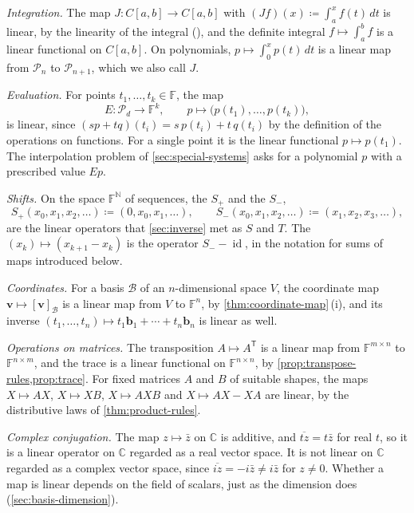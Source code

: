 \emph{Integration.} The map $J\colon C[a,b]\to C[a,b]$ with $(Jf)(x)\coloneqq\int_a^xf(t)\,dt$ is linear, by the linearity of the integral (), and the definite integral $f\mapsto\int_a^bf$ is a linear functional on $C[a,b]$. On polynomials, $p\mapsto\int_0^xp(t)\,dt$ is a linear map from $\mathcal P_n$ to $\mathcal P_{n+1}$, which we also call $J$.

\emph{Evaluation.} For points $t_1,\ldots,t_k\in\mathbb F$, the map
\[
E\colon\mathcal P_d\to\mathbb F^k,\qquad p\mapsto\bigl(p(t_1),\ldots,p(t_k)\bigr),
\]
is linear, since $(sp+tq)(t_i)=s\,p(t_i)+t\,q(t_i)$ by the definition of the operations on functions. For a single point it is the linear functional $p\mapsto p(t_1)$. The interpolation problem of \cref{sec:special-systems} asks for a polynomial $p$ with a prescribed value $Ep$.

\emph{Shifts.} On the space $\mathbb F^{\mathbb N}$ of sequences, the  $S_+$ and the  $S_-$,
\[
S_+(x_0,x_1,x_2,\ldots)\coloneqq(0,x_0,x_1,\ldots),\qquad S_-(x_0,x_1,x_2,\ldots)\coloneqq(x_1,x_2,x_3,\ldots),
\]
are the linear operators that \cref{sec:inverse} met as $S$ and $T$. The  $(x_k)\mapsto(x_{k+1}-x_k)$ is the operator $S_--\operatorname{id}$, in the notation for sums of maps introduced below.

\emph{Coordinates.} For a basis $\mathcal B$ of an $n$-dimensional space $V$, the coordinate map $\mathbf v\mapsto[\mathbf v]_{\mathcal B}$ is a linear map from $V$ to $\mathbb F^n$, by \cref{thm:coordinate-map}\,(i), and its inverse $(t_1,\ldots,t_n)\mapsto t_1\mathbf b_1+\cdots+t_n\mathbf b_n$ is linear as well.

\emph{Operations on matrices.} The transposition $A\mapsto A^{\mathsf T}$ is a linear map from $\mathbb F^{m\times n}$ to $\mathbb F^{n\times m}$, and the trace is a linear functional on $\mathbb F^{n\times n}$, by \cref{prop:transpose-rules,prop:trace}. For fixed matrices $A$ and $B$ of suitable shapes, the maps $X\mapsto AX$, $X\mapsto XB$, $X\mapsto AXB$ and $X\mapsto AX-XA$ are linear, by the distributive laws of \cref{thm:product-rules}.

\emph{Complex conjugation.} The map $z\mapsto\bar z$ on $\mathbb C$ is additive, and $\overline{tz}=t\bar z$ for real $t$, so it is a linear operator on $\mathbb C$ regarded as a real vector space. It is not linear on $\mathbb C$ regarded as a complex vector space, since $\overline{iz}=-i\bar z\ne i\bar z$ for $z\ne0$. Whether a map is linear depends on the field of scalars, just as the dimension does (\cref{sec:basis-dimension}).

